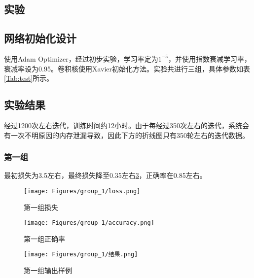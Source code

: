 \begin{spacing}{2}
    \section{实验}
\end{spacing}
\subsection{网络初始化设计}
使用Adam Optimizer，经过初步实验，学习率定为$1^{-5}$，并使用指数衰减学习率，衰减率设为0.95。卷积核使用Xavier初始化方法。实验共进行三组，具体参数如表\ref{Tab:test}所示。
\begin{table}[t]
    \centering
    \caption{损失函数}
    \label{Tab:test}
    \vspace{10mm}
\end{table}
\subsection{实验结果}
经过1200次左右迭代，训练时间约12小时。由于每经过350次左右的迭代，系统会有一次不明原因的内存泄漏导致，因此下方的折线图只有350轮左右的迭代数据。
\subsubsection{第一组}
最初损失为3.5左右，最终损失降至0.35左右\ref{Fig:loss_1}，正确率在0.85左右。
\begin{figure}[!t]
    \centering
    \texttt{[image: Figures/group\_1/loss.png]}
    \caption{第一组损失}
    \label{Fig:loss_1}
\end{figure}
\begin{figure}[!t]
    \centering
    \texttt{[image: Figures/group\_1/accuracy.png]}
    \caption{第一组正确率}
    \label{Fig:loss_1}
\end{figure}
\begin{figure}[!t]
    \centering
    \texttt{[image: Figures/group\_1/结果.png]}
    \caption{第一组输出样例}
    \label{Fig:loss_1}
\end{figure}
